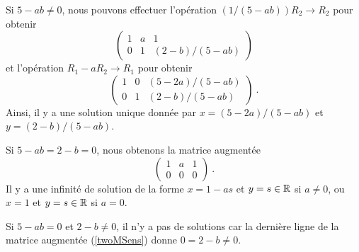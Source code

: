 { Si $5-ab \neq 0$, nous pouvons effectuer l'opération
$(1/(5-ab))R_2 \to R_2$ pour obtenir
\[
\left(\begin{array}{cc|c}
1 & a & 1 \\ 0 & 1 & (2-b)/(5-ab)
\end{array}\right)
\]
et l'opération $R_1 - aR_2 \to R_1$ pour obtenir
\[
\left(\begin{array}{cc|c}
1 & 0 & (5-2a)/(5-ab) \\ 0 & 1 & (2-b)/(5-ab)
\end{array}\right) \ .
\]
Ainsi, il y a une solution unique donnée par $x=(5-2a)/(5-ab)$ et
$y=(2-b)/(5-ab)$.

 Si $5-ab = 2-b = 0$, nous obtenons la matrice augmentée
\[
\left(\begin{array}{cc|c}
1 & a & 1 \\ 0 & 0 & 0
\end{array}\right) \ .
\]
Il y a une infinité de solution de la forme $x = 1-as$ et
$y = s \in\mathbb{R}$ si $a\neq 0$, ou $x=1$ et $y = s \in \mathbb{R}$ si $a=0$.

 Si $5-ab =0$ et $ 2-b \neq 0$, il n'y a pas de solutions car
la dernière ligne de la matrice augmentée (\ref{twoMSens}) donne
$0 = 2-b \neq 0$.
}

